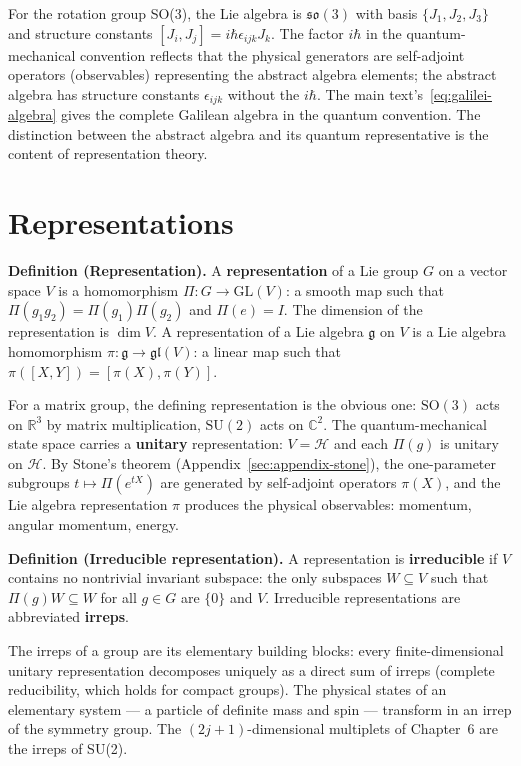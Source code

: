 For the rotation group SO(3), the Lie algebra is $\mathfrak{so}(3)$ with basis $\{J_1, J_2, J_3\}$ and structure constants $[J_i, J_j] = i\hbar\epsilon_{ijk}J_k$. The factor $i\hbar$ in the quantum-mechanical convention reflects that the physical generators are self-adjoint operators (observables) representing the abstract algebra elements; the abstract algebra has structure constants $\epsilon_{ijk}$ without the $i\hbar$. The main text's~\eqref{eq:galilei-algebra} gives the complete Galilean algebra in the quantum convention. The distinction between the abstract algebra and its quantum representative is the content of representation theory.

\section{Representations}
\label{sec:appendix-representations}

\medskip\noindent\textbf{Definition (Representation).} A \textbf{representation} of a Lie group $G$ on a vector space $V$ is a homomorphism $\Pi : G \to \mathrm{GL}(V)$: a smooth map such that $\Pi(g_1 g_2) = \Pi(g_1)\Pi(g_2)$ and $\Pi(e) = I$. The dimension of the representation is $\dim V$. A representation of a Lie algebra $\mathfrak{g}$ on $V$ is a Lie algebra homomorphism $\pi : \mathfrak{g} \to \mathfrak{gl}(V)$: a linear map such that $\pi([X,Y]) = [\pi(X), \pi(Y)]$.

For a matrix group, the defining representation is the obvious one: $\mathrm{SO}(3)$ acts on $\mathbb{R}^3$ by matrix multiplication, $\mathrm{SU}(2)$ acts on $\mathbb{C}^2$. The quantum-mechanical state space carries a \textbf{unitary} representation: $V = \mathcal{H}$ and each $\Pi(g)$ is unitary on $\mathcal{H}$. By Stone's theorem (Appendix~\ref{sec:appendix-stone}), the one-parameter subgroups $t \mapsto \Pi(e^{tX})$ are generated by self-adjoint operators $\pi(X)$, and the Lie algebra representation $\pi$ produces the physical observables: momentum, angular momentum, energy.

\medskip\noindent\textbf{Definition (Irreducible representation).} A representation is \textbf{irreducible} if $V$ contains no nontrivial invariant subspace: the only subspaces $W \subseteq V$ such that $\Pi(g)W \subseteq W$ for all $g \in G$ are $\{0\}$ and $V$. Irreducible representations are abbreviated \textbf{irreps}.

The irreps of a group are its elementary building blocks: every finite-dimensional unitary representation decomposes uniquely as a direct sum of irreps (complete reducibility, which holds for compact groups). The physical states of an elementary system --- a particle of definite mass and spin --- transform in an irrep of the symmetry group. The $(2j+1)$-dimensional multiplets of Chapter~6 are the irreps of SU(2).


